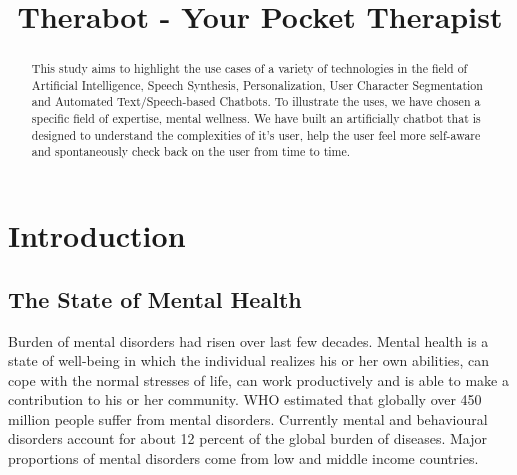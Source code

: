 \documentclass[conference,compsoc]{IEEEtran}
\begin{document}
\title{Therabot - Your Pocket Therapist}

\author{
\and
{}
\and
{}
}

\maketitle

\begin{abstract}
This study aims to highlight the use cases of a variety of technologies in the field of Artificial Intelligence, Speech Synthesis, Personalization, User Character Segmentation and Automated Text/Speech-based Chatbots. To illustrate the uses, we have chosen a specific field of expertise, mental wellness. We have built an artificially chatbot that is designed to understand the complexities of it’s user, help the user feel more self-aware and spontaneously check back on the user from time to time.
\end{abstract}


\section{Introduction}

\subsection{The State of Mental Health}

Burden of mental disorders had risen over last few decades. Mental health is a state of well-being in which the individual realizes his or her own abilities, can cope with the normal stresses of life, can work productively and is able to make a contribution to his or her community. WHO estimated that globally over 450 million people suffer from mental disorders. Currently mental and behavioural disorders account for about 12 percent of the global burden of diseases. Major proportions of mental disorders come from low and middle income countries.
\end{document}
